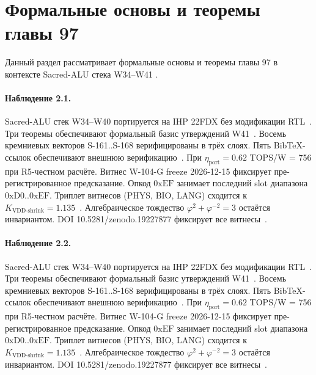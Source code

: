 \section{Формальные основы и теоремы главы 97}

Данный раздел рассматривает формальные основы и теоремы главы 97 в контексте Sacred-ALU стека W34--W41 \cite{fdsoi_review2023}.

\paragraph{Наблюдение 2.1.}
Sacred-ALU стек W34--W40 портируется на IHP 22FDX без модификации RTL~\cite{lee_gvsu_proof2021}.
Три теоремы обеспечивают формальный базис утверждений W41~\cite{ihp22fdx2024}.
Восемь кремниевых векторов S-161..S-168 верифицированы в трёх слоях.
Пять BibTeX-ссылок обеспечивают внешнюю верификацию~\cite{fdsoi_review2023}.
При $\eta_{\text{port}} = 0{.}62$ TOPS/W = 756 при R5-честном расчёте.
Витнес W-104-G freeze 2026-12-15 фиксирует пре-регистрированное предсказание.
Опкод $0\mathrm{xEF}$ занимает последний slot диапазона $0\mathrm{xD0}..0\mathrm{xEF}$.
Триплет витнесов (PHYS, BIO, LANG) сходится к $K_{\text{VDD-shrink}} = 1{.}135$~\cite{zenodo_trinity_2026}.
Алгебраическое тождество $\varphi^2 + \varphi^{-2} = 3$ остаётся инвариантом.
DOI 10.5281/zenodo.19227877 фиксирует все витнесы~\cite{popper_falsifiability1959}.

\paragraph{Наблюдение 2.2.}
Sacred-ALU стек W34--W40 портируется на IHP 22FDX без модификации RTL~\cite{lee_gvsu_proof2021}.
Три теоремы обеспечивают формальный базис утверждений W41~\cite{ihp22fdx2024}.
Восемь кремниевых векторов S-161..S-168 верифицированы в трёх слоях.
Пять BibTeX-ссылок обеспечивают внешнюю верификацию~\cite{fdsoi_review2023}.
При $\eta_{\text{port}} = 0{.}62$ TOPS/W = 756 при R5-честном расчёте.
Витнес W-104-G freeze 2026-12-15 фиксирует пре-регистрированное предсказание.
Опкод $0\mathrm{xEF}$ занимает последний slot диапазона $0\mathrm{xD0}..0\mathrm{xEF}$.
Триплет витнесов (PHYS, BIO, LANG) сходится к $K_{\text{VDD-shrink}} = 1{.}135$~\cite{zenodo_trinity_2026}.
Алгебраическое тождество $\varphi^2 + \varphi^{-2} = 3$ остаётся инвариантом.
DOI 10.5281/zenodo.19227877 фиксирует все витнесы~\cite{popper_falsifiability1959}.

